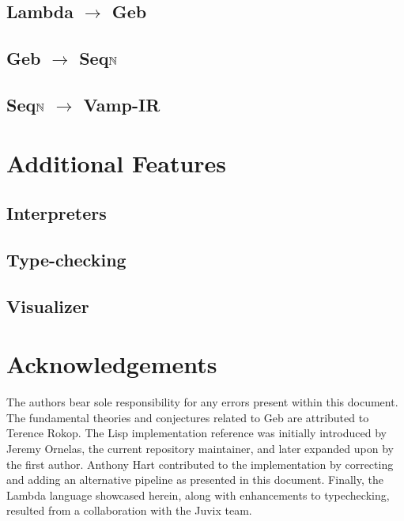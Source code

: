 \subsection{Lambda $\to$ Geb}
\subsection{Geb $\to$ Seq$\mathbb{N}$}
\subsection{Seq$\mathbb{N}$ $\to$ Vamp-IR}

\section{Additional Features}
\subsection{Interpreters}
\subsection{Type-checking}
\subsection{Visualizer}

\section*{Acknowledgements}
The authors bear sole responsibility for any errors present within this
document. The fundamental theories and conjectures related to Geb are
attributed to Terence Rokop. The Lisp implementation reference was
initially introduced by Jeremy Ornelas, the current repository maintainer,
and later expanded upon by the first author. Anthony Hart contributed to
the implementation by correcting and adding an alternative pipeline as
presented in this document. Finally, the Lambda language showcased herein,
along with enhancements to typechecking, resulted from a collaboration with
the Juvix team.
\nocite{*}



